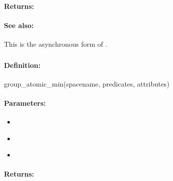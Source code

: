 \paragraph{Returns:}


\paragraph{See also:}  This is the asynchronous form of .

\pagebreak
\subsubsection{}
\label{api:ruby:group_atomic_min}


\paragraph{Definition:}
\begin{rubycode}
group_atomic_min(spacename, predicates, attributes)
\end{rubycode}

\paragraph{Parameters:}
\begin{itemize}[noitemsep]
\item {}\\

\item {}\\

\item {}\\

\end{itemize}

\paragraph{Returns:}


\pagebreak
\subsubsection{}
\label{api:ruby:async_group_atomic_min}


